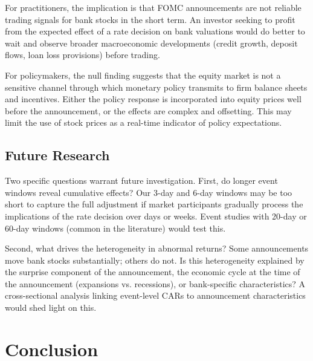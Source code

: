 \documentclass[11pt]{article}
\begin{document}
For practitioners, the implication is that FOMC announcements are not reliable trading signals for bank stocks in the short term. An investor seeking to profit from the expected effect of a rate decision on bank valuations would do better to wait and observe broader macroeconomic developments (credit growth, deposit flows, loan loss provisions) before trading.

For policymakers, the null finding suggests that the equity market is not a sensitive channel through which monetary policy transmits to firm balance sheets and incentives. Either the policy response is incorporated into equity prices well before the announcement, or the effects are complex and offsetting. This may limit the use of stock prices as a real-time indicator of policy expectations.

\subsection{Future Research}

Two specific questions warrant future investigation. First, do longer event windows reveal cumulative effects? Our 3-day and 6-day windows may be too short to capture the full adjustment if market participants gradually process the implications of the rate decision over days or weeks. Event studies with 20-day or 60-day windows (common in the literature) would test this.

Second, what drives the heterogeneity in abnormal returns? Some announcements move bank stocks substantially; others do not. Is this heterogeneity explained by the surprise component of the announcement, the economic cycle at the time of the announcement (expansions vs. recessions), or bank-specific characteristics? A cross-sectional analysis linking event-level CARs to announcement characteristics would shed light on this.

\section{Conclusion}
\end{document}
